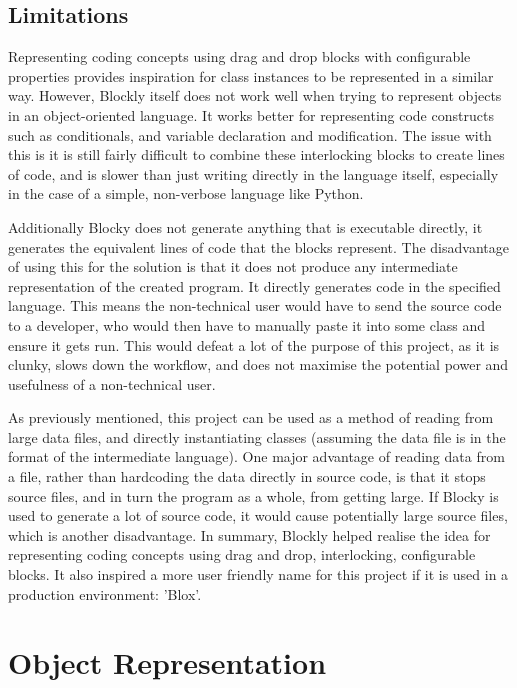 \subsection{Limitations}
Representing coding concepts using drag and drop blocks with configurable properties provides inspiration for class instances to be represented in a similar way. However, Blockly itself does not work well when trying to represent objects in an object-oriented language. It works better for representing code constructs such as conditionals, and variable declaration and modification. The issue with this is it is still fairly difficult to combine these interlocking blocks to create lines of code, and is slower than just writing directly in the language itself, especially in the case of a simple, non-verbose language like Python.\par
Additionally Blocky does not generate anything that is executable directly, it generates the equivalent lines of code that the blocks represent. The disadvantage of using this for the solution is that it does not produce any intermediate representation of the created program. It directly generates code in the specified language. This means the non-technical user would have to send the source code to a developer, who would then have to manually paste it into some class and ensure it gets run. This would defeat a lot of the purpose of this project, as it is clunky, slows down the workflow, and does not maximise the potential power and usefulness of a non-technical user.\par
As previously mentioned, this project can be used as a method of reading from large data files, and directly instantiating classes (assuming the data file is in the format of the intermediate language). One major advantage of reading data from a file, rather than hardcoding the data directly in source code, is that it stops source files, and in turn the program as a whole, from getting large. If Blocky is used to generate a lot of source code, it would cause potentially large source files, which is another disadvantage. In summary, Blockly helped realise the idea for representing coding concepts using drag and drop, interlocking, configurable blocks. It also inspired a more user friendly name for this project if it is used in a production environment: 'Blox'.

\section{Object Representation}

